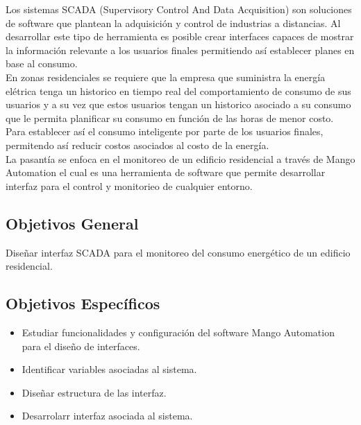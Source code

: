     Los sistemas SCADA (Supervisory Control And Data Acquisition) son soluciones de software que plantean la adquisición y 
    control de industrias a distancias. Al desarrollar este tipo de herramienta es posible crear interfaces capaces de 
    mostrar la información relevante a los usuarios finales permitiendo así establecer planes en base al consumo.\\

    En zonas residenciales se requiere que la empresa que suministra la energía elétrica tenga un historico en tiempo real 
    del comportamiento de consumo de sus usuarios y a su vez que estos usuarios tengan un historico asociado a su consumo 
    que le permita planificar su consumo en función de las horas de menor costo. Para establecer así el consumo inteligente 
    por parte de los usuarios finales, permitendo así reducir costos asociados al costo de la energía.\\
        
    La pasantía se enfoca en el monitoreo de un edificio residencial a través de Mango Automation el cual es una herramienta
    de software que permite desarrollar interfaz para el control y monitorieo de cualquier entorno.

\subsection{Objetivos General}
    Diseñar interfaz SCADA para el 
    monitoreo del consumo energético de un 
    edificio residencial.

\subsection{Objetivos Específicos}
\begin{itemize}
    \item Estudiar funcionalidades y configuración
    del software Mango Automation para el diseño de 
    interfaces.
    \item Identificar variables asociadas al sistema.
    \item Diseñar estructura de las interfaz.
    \item Desarrolarr interfaz asociada al sistema.
\end{itemize}
\newpage